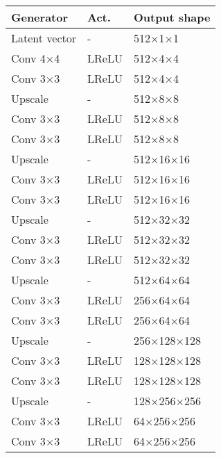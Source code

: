 \documentclass[journal, onecolumn]{IEEEtran}
\begin{document}
\begin{table}[H]
\begin{minipage}[t]{0.48\linewidth}
\centering
\begin{adjustbox}{width=0.72\columnwidth,left}
\noindent\parbox[t][][t]{.74\linewidth}{
\begin{tabular}[t]{|lll|}
\hline
\textbf{Generator}       & Act.  & Output shape \\ \hline
Latent vector  & -      & 512$\times$1$\times$1      \\
Conv 4$\times$4      & LReLU & 512$\times$4$\times$4     \\
Conv 3$\times$3      & LReLU & 512$\times$4$\times$4      \\ \hline

Upscale          & -      & 512$\times$8$\times$8  \\
Conv 3$\times$3      & LReLU & 512$\times$8$\times$8      \\
Conv 3$\times$3      & LReLU & 512$\times$8$\times$8      \\ \hline

Upscale          & -      & 512$\times$16$\times$16  \\
Conv 3$\times$3      & LReLU & 512$\times$16$\times$16      \\
Conv 3$\times$3      & LReLU & 512$\times$16$\times$16      \\ \hline

Upscale          & -      & 512$\times$32$\times$32  \\
Conv 3$\times$3      & LReLU & 512$\times$32$\times$32      \\
Conv 3$\times$3      & LReLU & 512$\times$32$\times$32      \\ \hline

Upscale          & -      & 512$\times$64$\times$64  \\
Conv 3$\times$3      & LReLU & 256$\times$64$\times$64      \\
Conv 3$\times$3      & LReLU & 256$\times$64$\times$64      \\ \hline

Upscale          & -      & 256$\times$128$\times$128  \\
Conv 3$\times$3      & LReLU & 128$\times$128$\times$128      \\
Conv 3$\times$3      & LReLU & 128$\times$128$\times$128      \\ \hline

Upscale          & -      & 128$\times$256$\times$256  \\
Conv 3$\times$3      & LReLU & 64$\times$256$\times$256      \\
Conv 3$\times$3      & LReLU & 64$\times$256$\times$256      \\ \hline


\end{tabular}}
\end{adjustbox}
\end{minipage}
\end{table}
\end{document}
